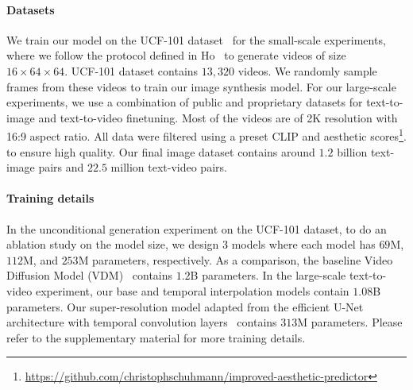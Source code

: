 \documentclass[10pt,twocolumn,letterpaper]{article}
\newcommand{\new}[1]{#1}
\begin{document}
\paragraph{Datasets} We train our model on the UCF-101 dataset~\cite{soomro2012ucf101} for the small-scale experiments, where we follow the protocol defined in Ho~\etal\cite{ho2022video} to generate videos of size $16\times64\times64$. 
\new{UCF-101 dataset contains $13,320$ videos. We randomly sample frames from these videos to train our image synthesis model. For our large-scale experiments, we use a combination of public and proprietary datasets for text-to-image and text-to-video finetuning. Most of the videos are of 2K resolution with 16:9 aspect ratio.} All data were filtered using a preset CLIP and aesthetic scores\footnote{\footnotesize \url{https://github.com/christophschuhmann/improved-aesthetic-predictor}}. to ensure high quality. 
Our final image dataset contains around $1.2$ billion text-image pairs and $22.5$ million text-video pairs.


\paragraph{Training details} 
In the unconditional generation experiment on the UCF-101 dataset, to do an ablation study on the model size, we design 3 models where each model has $69$M, $112$M, and $253$M parameters, respectively. As a comparison, 
the baseline Video Diffusion Model (VDM)~\cite{ho2022video} contains $1.2$B parameters. In the large-scale text-to-video experiment, our base and temporal interpolation models contain $1.08$B parameters. Our super-resolution model adapted from the efficient U-Net~\cite{saharia2022photorealistic} architecture with temporal convolution layers~\cite{ho2022imagen,singer2022make} contains $313$M parameters. Please refer to the supplementary material for more training details.
\end{document}
